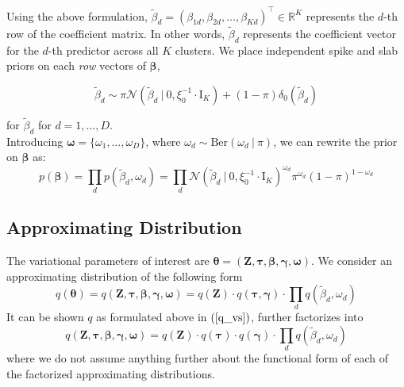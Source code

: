 \documentclass[twoside,11pt]{article}
\newcommand\given[1][]{\:#1\vert\:}
\newcommand{\transpose}[1]{#1^{\intercal}}
\newcommand{\R}{\mathbb{R}}
\newcommand{\boldbeta}{\boldsymbol\beta}
\newcommand{\boldgamma}{\boldsymbol\gamma}
\newcommand{\boldtau}{\boldsymbol\tau}
\newcommand{\betad}{\tilde{\beta}_d}
\newcommand{\priorbeta}{\mathcal{N} \left( \betad \given 0, \xi_0^{-1} \cdot \mathrm{I}_K \right)}
\newcommand{\pr}[1]{p \left( #1 \right)}
\begin{document}
Using the above formulation, $\betad = \transpose{\left( \beta_{1d}, \beta_{2d}, \ldots, \beta_{Kd}\right)} \in \R^K$ represents the $d$-th row of the coefficient matrix. In other words, $\betad$ represents the coefficient vector for the $d$-th predictor across all $K$ clusters. We place independent spike and slab priors on each \textit{row} vectors of $\boldbeta$, 

\begin{equation} 
	\betad \sim \pi \priorbeta + (1 - \pi) \delta_0 (\betad)
\end{equation}

for $\betad$ for $d = 1, \ldots, D$. \\

Introducing $\boldsymbol \omega = \{ \omega_1, \ldots, \omega_D\}$, where $\omega_d \sim \mathrm{Ber}(\omega_d \given \pi)$, we can rewrite the prior on $\boldbeta$ as:
\begin{equation} \label{eq:beta_joint_prior_vs}
	\pr{\boldbeta} = \prod_{d} \pr{\betad, \omega_d} = \prod_{d} \priorbeta^{\omega_d} \pi^{\omega_d} (1-\pi)^{1 - \omega_d}
\end{equation}

\subsection{Approximating Distribution}

The variational parameters of interest are $\boldsymbol \theta = \left(\mathbf{Z}, \boldtau, \boldbeta, \boldgamma, \boldsymbol \omega \right)$. We consider an approximating distribution of the following form
\begin{equation} \label{q_vs}
	q(\boldsymbol \theta) = q \left(\mathbf{Z}, \boldtau, \boldbeta, \boldgamma, \boldsymbol \omega \right) = q(\mathbf{Z}) \cdot q(\boldtau, \boldgamma) \cdot \prod_{d} q(\betad, \omega_d)
\end{equation}
It can be shown $q$ as formulated above in $(\ref{q_vs})$, further factorizes into
\begin{equation} \label{q_vs_fact}
	q \left(\mathbf{Z}, \boldtau, \boldbeta, \boldgamma, \boldsymbol \omega \right) =  q(\mathbf{Z}) \cdot q(\boldtau) \cdot q(\boldgamma) \cdot \prod_{d} q(\betad, \omega_d)
\end{equation}
where we do not assume anything further about the functional form of each of the factorized approximating distributions. 
\end{document}

